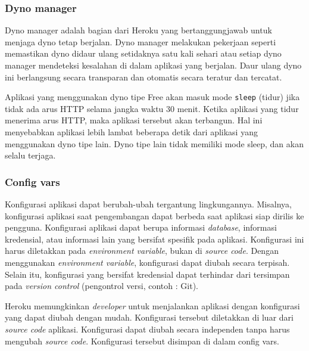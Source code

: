 \subsubsection{Dyno manager}
Dyno manager adalah bagian dari Heroku yang bertanggungjawab untuk menjaga dyno tetap berjalan. Dyno manager melakukan pekerjaan seperti memastikan dyno didaur ulang setidaknya satu kali sehari atau setiap dyno manager mendeteksi kesalahan di dalam aplikasi yang berjalan. Daur ulang dyno ini berlangsung secara transparan dan otomatis secara teratur dan tercatat.

Aplikasi yang menggunakan dyno tipe Free akan masuk mode \texttt{sleep} (tidur) jika tidak ada arus HTTP selama jangka waktu 30 menit. Ketika aplikasi yang tidur menerima arus HTTP, maka aplikasi tersebut akan terbangun. Hal ini menyebabkan aplikasi lebih lambat beberapa detik dari aplikasi yang menggunakan dyno tipe lain. Dyno tipe lain tidak memiliki mode sleep, dan akan selalu terjaga.

\subsubsection{Config vars}
Konfigurasi aplikasi dapat berubah-ubah tergantung lingkungannya. Misalnya, konfigurasi aplikasi saat pengembangan dapat berbeda saat aplikasi siap dirilis ke pengguna. Konfigurasi aplikasi dapat berupa informasi \textit{database}, informasi kredensial, atau informasi lain yang bersifat spesifik pada aplikasi. Konfigurasi ini harus diletakkan pada \textit{environment variable}, bukan di \textit{source code}. Dengan menggunakan \textit{environment variable}, konfigurasi dapat diubah secara terpisah. Selain itu, konfigurasi yang bersifat kredensial dapat terhindar dari tersimpan pada \textit{version control} (pengontrol versi, contoh : Git).

Heroku memungkinkan \textit{developer} untuk menjalankan aplikasi dengan konfigurasi yang dapat diubah dengan mudah. Konfigurasi tersebut diletakkan di luar dari \textit{source code} aplikasi. Konfigurasi dapat diubah secara independen tanpa harus mengubah \textit{source code}. Konfigurasi tersebut disimpan di dalam config vars.

